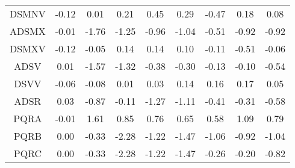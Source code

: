 \begin{longtable}{ | c || c | c | c | c | c | c | c || c |}
DSMNV &  \cellcolor[HTML]{FFFFFF} -0.12 &  \cellcolor[HTML]{FFFFFF} 0.01 &  \cellcolor[HTML]{F7F7FF} 0.21 &  \cellcolor[HTML]{F7F7FF} 0.45 &  \cellcolor[HTML]{F7F7FF} 0.29 &  \cellcolor[HTML]{FFF7F7} -0.47 &  \cellcolor[HTML]{F7F7FF} 0.18 &  \cellcolor[HTML]{FFFFFF} 0.08 \\
ADSMX &  \cellcolor[HTML]{FFFFFF} -0.01 &  \cellcolor[HTML]{FFCFCF} -1.76 &  \cellcolor[HTML]{FFDFDF} -1.25 &  \cellcolor[HTML]{FFE7E7} -0.96 &  \cellcolor[HTML]{FFE7E7} -1.04 &  \cellcolor[HTML]{FFEFEF} -0.51 &  \cellcolor[HTML]{FFE7E7} -0.92 &  \cellcolor[HTML]{FFE7E7} -0.92 \\
DSMXV &  \cellcolor[HTML]{FFFFFF} -0.12 &  \cellcolor[HTML]{FFFFFF} -0.05 &  \cellcolor[HTML]{FFFFFF} 0.14 &  \cellcolor[HTML]{FFFFFF} 0.14 &  \cellcolor[HTML]{FFFFFF} 0.10 &  \cellcolor[HTML]{FFFFFF} -0.11 &  \cellcolor[HTML]{FFEFEF} -0.51 &  \cellcolor[HTML]{FFFFFF} -0.06 \\
ADSV &  \cellcolor[HTML]{FFFFFF} 0.01 &  \cellcolor[HTML]{FFD7D7} -1.57 &  \cellcolor[HTML]{FFDFDF} -1.32 &  \cellcolor[HTML]{FFF7F7} -0.38 &  \cellcolor[HTML]{FFF7F7} -0.30 &  \cellcolor[HTML]{FFFFFF} -0.13 &  \cellcolor[HTML]{FFFFFF} -0.10 &  \cellcolor[HTML]{FFEFEF} -0.54 \\
DSVV &  \cellcolor[HTML]{FFFFFF} -0.06 &  \cellcolor[HTML]{FFFFFF} -0.08 &  \cellcolor[HTML]{FFFFFF} 0.01 &  \cellcolor[HTML]{FFFFFF} 0.03 &  \cellcolor[HTML]{FFFFFF} 0.14 &  \cellcolor[HTML]{FFFFFF} 0.16 &  \cellcolor[HTML]{F7F7FF} 0.17 &  \cellcolor[HTML]{FFFFFF} 0.05 \\
ADSR &  \cellcolor[HTML]{FFFFFF} 0.03 &  \cellcolor[HTML]{FFE7E7} -0.87 &  \cellcolor[HTML]{FFFFFF} -0.11 &  \cellcolor[HTML]{FFDFDF} -1.27 &  \cellcolor[HTML]{FFDFDF} -1.11 &  \cellcolor[HTML]{FFF7F7} -0.41 &  \cellcolor[HTML]{FFF7F7} -0.31 &  \cellcolor[HTML]{FFEFEF} -0.58 \\
PQRA &  \cellcolor[HTML]{FFFFFF} -0.01 &  \cellcolor[HTML]{D7D7FF} 1.61 &  \cellcolor[HTML]{E7E7FF} 0.85 &  \cellcolor[HTML]{EFEFFF} 0.76 &  \cellcolor[HTML]{EFEFFF} 0.65 &  \cellcolor[HTML]{EFEFFF} 0.58 &  \cellcolor[HTML]{E7E7FF} 1.09 &  \cellcolor[HTML]{EFEFFF} 0.79 \\
PQRB &  \cellcolor[HTML]{FFFFFF} 0.00 &  \cellcolor[HTML]{FFF7F7} -0.33 &  \cellcolor[HTML]{FFC7C7} -2.28 &  \cellcolor[HTML]{FFDFDF} -1.22 &  \cellcolor[HTML]{FFD7D7} -1.47 &  \cellcolor[HTML]{FFE7E7} -1.06 &  \cellcolor[HTML]{FFE7E7} -0.92 &  \cellcolor[HTML]{FFE7E7} -1.04 \\
PQRC &  \cellcolor[HTML]{FFFFFF} 0.00 &  \cellcolor[HTML]{FFF7F7} -0.33 &  \cellcolor[HTML]{FFC7C7} -2.28 &  \cellcolor[HTML]{FFDFDF} -1.22 &  \cellcolor[HTML]{FFD7D7} -1.47 &  \cellcolor[HTML]{FFF7F7} -0.26 &  \cellcolor[HTML]{FFF7F7} -0.20 &  \cellcolor[HTML]{FFE7E7} -0.82 \\

\end{longtable}
